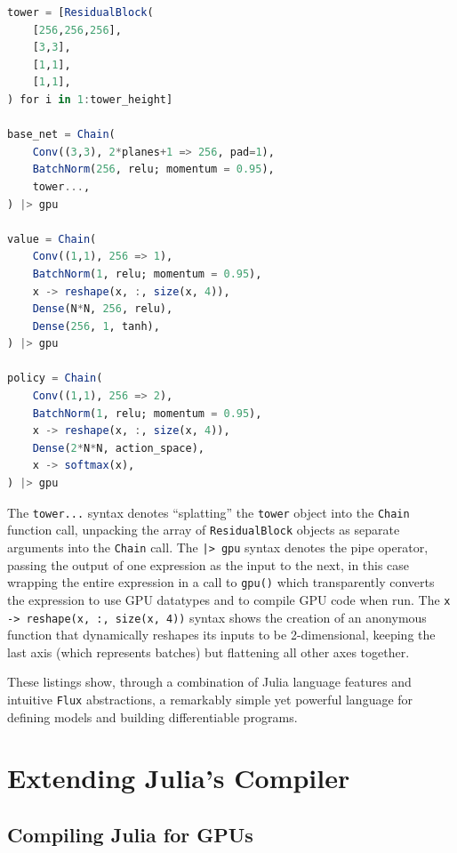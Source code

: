 \documentclass{juliacon}
\begin{document}
\begin{lstlisting}[language = Julia,
                  label={lst:alpha_go_zero},
                  caption={AlphaGo Zero model in \texttt{Flux}, parameterized by the values of \texttt{tower\_height}, \texttt{planes}, \texttt{N} and \texttt{action\_space}},
                  captionpos=b]
tower = [ResidualBlock(
    [256,256,256],
    [3,3],
    [1,1],
    [1,1],
) for i in 1:tower_height]

base_net = Chain(
    Conv((3,3), 2*planes+1 => 256, pad=1),
    BatchNorm(256, relu; momentum = 0.95),
    tower...,
) |> gpu

value = Chain(
    Conv((1,1), 256 => 1),
    BatchNorm(1, relu; momentum = 0.95),
    x -> reshape(x, :, size(x, 4)),
    Dense(N*N, 256, relu),
    Dense(256, 1, tanh),
) |> gpu
    
policy = Chain(
    Conv((1,1), 256 => 2),
    BatchNorm(1, relu; momentum = 0.95),
    x -> reshape(x, :, size(x, 4)),
    Dense(2*N*N, action_space),
    x -> softmax(x),
) |> gpu
\end{lstlisting}

The \texttt{tower...} syntax denotes ``splatting'' the \texttt{tower} object into the \texttt{Chain} function call, unpacking the array of \texttt{ResidualBlock} objects as separate arguments into the \texttt{Chain} call.  The \texttt{|> gpu} syntax denotes the pipe operator, passing the output of one expression as the input to the next, in this case wrapping the entire expression in a call to \texttt{gpu()} which transparently converts the expression to use GPU datatypes and to compile GPU code when run.  The \texttt{x -> reshape(x, :, size(x, 4))} syntax shows the creation of an anonymous function that dynamically reshapes its inputs to be 2-dimensional, keeping the last axis (which represents batches) but flattening all other axes together.

These listings show, through a combination of Julia language features and intuitive \texttt{Flux} abstractions, a remarkably simple yet powerful language for defining models and building differentiable programs.

\section{Extending Julia's Compiler}

\subsection{Compiling Julia for GPUs}
\label{gpu}
\end{document}
